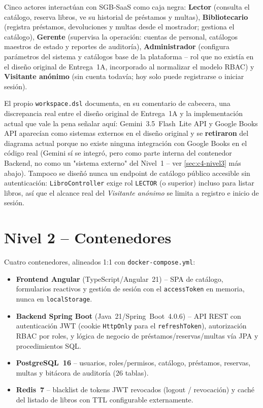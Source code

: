 Cinco actores interactúan con SGB-SaaS como caja negra: \textbf{Lector}
(consulta el catálogo, reserva libros, ve su historial de préstamos y
multas), \textbf{Bibliotecario} (registra préstamos, devoluciones y
multas desde el mostrador; gestiona el catálogo),
\textbf{Gerente} (supervisa la operación: cuentas de personal, catálogos
maestros de estado y reportes de auditoría), \textbf{Administrador}
(configura parámetros del sistema y catálogos base de la plataforma --
rol que no existía en el diseño original de Entrega~1A, incorporado al
normalizar el modelo RBAC) y \textbf{Visitante anónimo} (sin cuenta
todavía; hoy solo puede registrarse o iniciar sesión).

El propio \texttt{workspace.dsl} documenta, en su comentario de
cabecera, una discrepancia real entre el diseño original de Entrega~1A y
la implementación actual que vale la pena señalar aquí: Gemini~3.5~Flash~Lite
API y Google Books API aparecían como sistemas externos en el diseño
original y se \textbf{retiraron} del diagrama actual porque no existe
ninguna integración con Google Books en el código real (Gemini sí se
integró, pero como parte interna del contenedor Backend, no como un
"sistema externo" del Nivel~1 -- ver \autoref{sec:c4-nivel3} más
abajo). Tampoco se
diseñó nunca un endpoint de catálogo público accesible sin
autenticación: \texttt{LibroController} exige rol \texttt{LECTOR} (o
superior) incluso para listar libros, así que el alcance real del
\emph{Visitante anónimo} se limita a registro e inicio de sesión.

\section{Nivel 2 -- Contenedores}

Cuatro contenedores, alineados 1:1 con \texttt{docker-compose.yml}:

\begin{itemize}[leftmargin=1.2cm]
  \item \textbf{Frontend Angular} (TypeScript/Angular~21) -- SPA de
    catálogo, formularios reactivos y gestión de sesión con el
    \texttt{accessToken} en memoria, nunca en \texttt{localStorage}.
  \item \textbf{Backend Spring Boot} (Java~21/Spring~Boot~4.0.6) -- API
    REST con autenticación JWT (cookie \texttt{HttpOnly} para el
    \texttt{refreshToken}), autorización RBAC por roles, y lógica de
    negocio de préstamos/reservas/multas vía JPA y procedimientos SQL.
  \item \textbf{PostgreSQL~16} -- usuarios, roles/permisos, catálogo,
    préstamos, reservas, multas y bitácora de auditoría (26 tablas).
  \item \textbf{Redis~7} -- blacklist de tokens JWT revocados (logout /
    revocación) y caché del listado de libros con TTL configurable
    externamente.
  \end{itemize}

